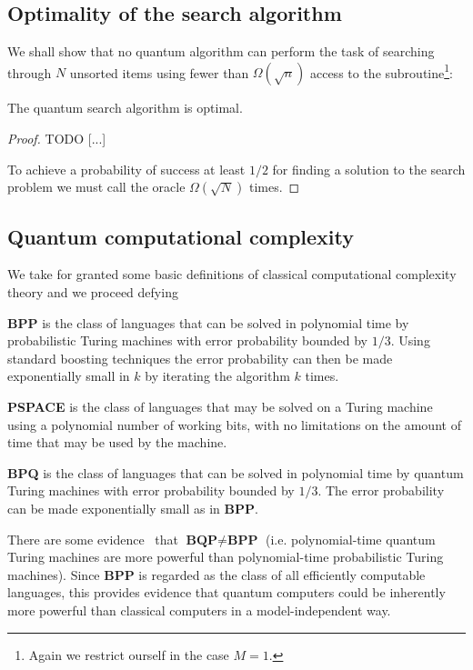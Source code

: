\subsection{Optimality of the search algorithm}
We shall show that no quantum algorithm can perform the task of searching through $N$ unsorted items using fewer than $\Omega(\sqrt{n})$ access to the subroutine\footnote{Again we restrict ourself in the case $M=1$.}:
\begin{theorem}
The quantum search algorithm is optimal. 
\end{theorem}
\begin{proof}
TODO [...]

To achieve a probability of success at least $1/2$ for finding a solution to the search problem we must call the oracle $\Omega(\sqrt{N})$ times.
\end{proof}

\subsection{Quantum computational complexity}
We take for granted some basic definitions of classical computational complexity theory and we proceed defying
\begin{defn}
\textbf{BPP} is the class of languages that can be solved in polynomial time by probabilistic Turing machines with error probability bounded by $1/3$. Using standard boosting techniques the error probability can then be made exponentially small in $k$ by iterating the algorithm $k$ times.
\end{defn}
\begin{defn}
\textbf{PSPACE} is the class of languages that may be solved on a Turing machine using a polynomial number of working bits, with no limitations on the amount of time that may be used by the machine.
\end{defn}
\begin{defn}
\textbf{BPQ} is the class of languages that can be solved in polynomial time by quantum Turing machines with error probability bounded by $1/3$. The error probability can be made exponentially small as in \textbf{BPP}.
\end{defn}
There are some evidence~\cite{Bennett_1997} that $\textbf{BQP} \neq \textbf{BPP}$ (i.e. polynomial-time quantum Turing machines are more powerful than polynomial-time probabilistic Turing machines). Since \textbf{BPP} is regarded as the class of all efficiently computable languages, this provides evidence that quantum computers could be inherently more powerful than classical computers in a model-independent way.

